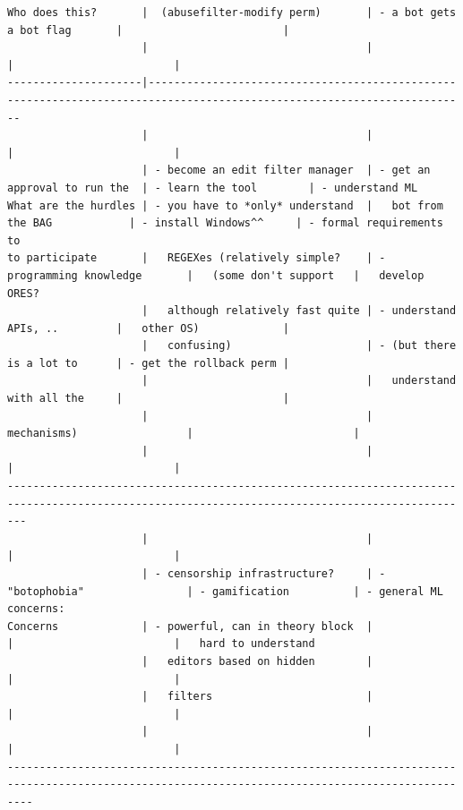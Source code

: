 \begin{verbatim}
Who does this?       |  (abusefilter-modify perm)       | - a bot gets a bot flag       |                         |
                     |                                  |                               |                         |
---------------------|------------------------------------------------------------------------------------------------------------------------
                     |                                  |                               |                         |
                     | - become an edit filter manager  | - get an approval to run the  | - learn the tool        | - understand ML
What are the hurdles | - you have to *only* understand  |   bot from the BAG            | - install Windows^^     | - formal requirements to
to participate       |   REGEXes (relatively simple?    | - programming knowledge       |   (some don't support   |   develop ORES?
                     |   although relatively fast quite | - understand APIs, ..         |   other OS)             |
                     |   confusing)                     | - (but there is a lot to      | - get the rollback perm |
                     |                                  |   understand with all the     |                         |
                     |                                  |   mechanisms)                 |                         |
                     |                                  |                               |                         |
-----------------------------------------------------------------------------------------------------------------------------------------------
                     |                                  |                               |                         |
                     | - censorship infrastructure?     | - "botophobia"                | - gamification          | - general ML concerns:
Concerns             | - powerful, can in theory block  |                               |                         |   hard to understand
                     |   editors based on hidden        |                               |                         |
                     |   filters                        |                               |                         |
                     |                                  |                               |                         |
------------------------------------------------------------------------------------------------------------------------------------------------
\end{verbatim}

